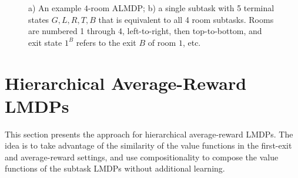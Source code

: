 \begin{figure}
  \begin{center}
  
  \end{center}
  \caption{a) An example $4$-room ALMDP; b) a single subtask with 5 terminal states $G,L,R,T,B$ that is equivalent to all 4 room subtasks. Rooms are numbered 1 through 4, left-to-right, then top-to-bottom, and exit state $1^B$ refers to the exit $B$ of room $1$, etc. \\}
  \label{fig:ex}
\end{figure}

\section{Hierarchical Average-Reward LMDPs}

This section presents the approach for hierarchical average-reward LMDPs. The idea is to take advantage of the similarity of the value functions in the first-exit and average-reward settings, and use compositionality to compose the value functions of the subtask LMDPs without additional learning.

